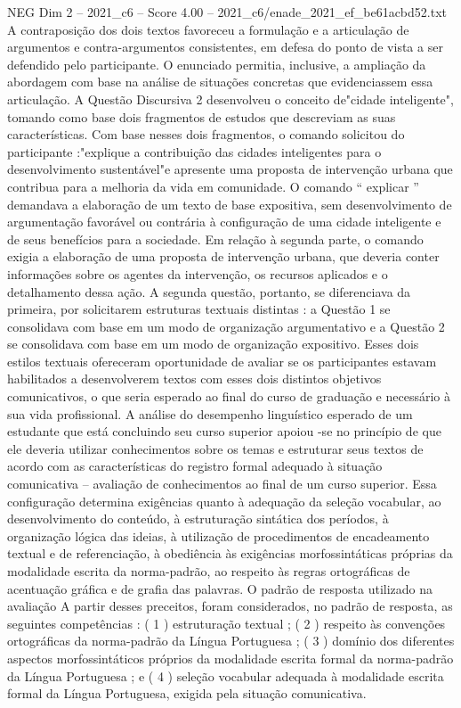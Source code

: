 \begin{textsample}{NEG Dim 2 – 2021\_c6 – Score 4.00 – 2021\_c6/enade\_2021\_ef\_be61acbd52.txt}
A contraposição dos dois textos favoreceu a formulação e a articulação de argumentos e contra-argumentos consistentes, em defesa do ponto de vista a ser defendido pelo participante.
O enunciado permitia, inclusive, a ampliação da abordagem com base na análise de situações concretas que evidenciassem essa articulação.
A Questão Discursiva 2 desenvolveu o conceito de"cidade inteligente", tomando como base dois fragmentos de estudos que descreviam as suas características.
Com base nesses dois fragmentos, o comando solicitou do participante :"explique a contribuição das cidades inteligentes para o desenvolvimento sustentável"e apresente uma proposta de intervenção urbana que contribua para a melhoria da vida em comunidade.
O comando “ explicar ” demandava a elaboração de um texto de base expositiva, sem desenvolvimento de argumentação favorável ou contrária à configuração de uma cidade inteligente e de seus benefícios para a sociedade.
Em relação à segunda parte, o comando exigia a elaboração de uma proposta de intervenção urbana, que deveria conter informações sobre os agentes da intervenção, os recursos aplicados e o detalhamento dessa ação.
A segunda questão, portanto, se diferenciava da primeira, por solicitarem estruturas textuais distintas : a Questão 1 se consolidava com base em um modo de organização argumentativo e a Questão 2 se consolidava com base em um modo de organização expositivo.
Esses dois estilos textuais ofereceram oportunidade de avaliar se os participantes estavam habilitados a desenvolverem textos com esses dois distintos objetivos comunicativos, o que seria esperado ao final do curso de graduação e necessário à sua vida profissional.
A análise do desempenho linguístico esperado de um estudante que está concluindo seu curso superior apoiou -se no princípio de que ele deveria utilizar conhecimentos sobre os temas e estruturar seus textos de acordo com as características do registro formal adequado à situação comunicativa – avaliação de conhecimentos ao final de um curso superior.
Essa configuração determina exigências quanto à adequação da seleção vocabular, ao desenvolvimento do conteúdo, à estruturação sintática dos períodos, à organização lógica das ideias, à utilização de procedimentos de encadeamento textual e de referenciação, à obediência às exigências morfossintáticas próprias da modalidade escrita da norma-padrão, ao respeito às regras ortográficas de acentuação gráfica e de grafia das palavras.
O padrão de resposta utilizado na avaliação A partir desses preceitos, foram considerados, no padrão de resposta, as seguintes competências : ( 1 ) estruturação textual ; ( 2 ) respeito às convenções ortográficas da norma-padrão da Língua Portuguesa ; ( 3 ) domínio dos diferentes aspectos morfossintáticos próprios da modalidade escrita formal da norma-padrão da Língua Portuguesa ; e ( 4 ) seleção vocabular adequada à modalidade escrita formal da Língua Portuguesa, exigida pela situação comunicativa.

\end{textsample}
